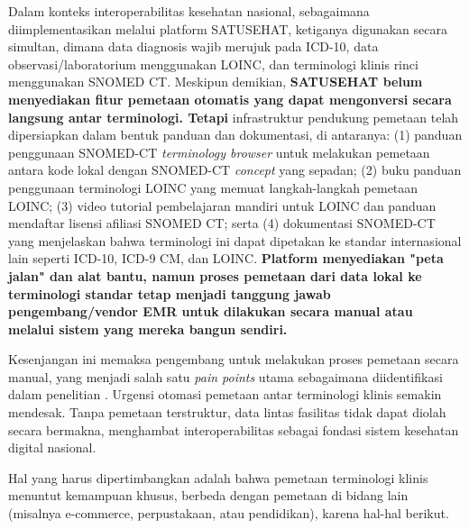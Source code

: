 Dalam konteks interoperabilitas kesehatan nasional, sebagaimana diimplementasikan melalui platform SATUSEHAT, ketiganya digunakan secara simultan, dimana data diagnosis wajib merujuk pada ICD-10, data observasi/laboratorium menggunakan LOINC, dan terminologi klinis rinci menggunakan SNOMED CT. Meskipun demikian, \textbf{SATUSEHAT belum menyediakan fitur pemetaan otomatis yang dapat mengonversi secara langsung antar terminologi. Tetapi} infrastruktur pendukung pemetaan telah dipersiapkan dalam bentuk panduan dan dokumentasi, di antaranya: (1) panduan penggunaan SNOMED-CT \textit{terminology browser} untuk melakukan pemetaan antara kode lokal dengan SNOMED-CT \textit{concept} yang sepadan; (2) buku panduan penggunaan terminologi LOINC yang memuat langkah-langkah pemetaan LOINC; (3) video tutorial pembelajaran mandiri untuk LOINC dan panduan mendaftar lisensi afiliasi SNOMED CT; serta (4) dokumentasi SNOMED-CT yang menjelaskan bahwa terminologi ini dapat dipetakan ke standar internasional lain seperti ICD-10, ICD-9 CM, dan LOINC. \textbf{Platform menyediakan "peta jalan" dan alat bantu, namun proses pemetaan dari data lokal ke terminologi standar tetap menjadi tanggung jawab pengembang/vendor EMR untuk dilakukan secara manual atau melalui sistem yang mereka bangun sendiri.}

Kesenjangan ini memaksa pengembang untuk melakukan proses pemetaan secara manual, yang menjadi salah satu \textit{pain points} utama sebagaimana diidentifikasi dalam penelitian \citet{heryawan_fast_2025}. Urgensi otomasi pemetaan antar terminologi klinis semakin mendesak. Tanpa pemetaan terstruktur, data lintas fasilitas tidak dapat diolah secara bermakna, menghambat interoperabilitas sebagai fondasi sistem kesehatan digital nasional.

Hal yang harus dipertimbangkan adalah bahwa pemetaan terminologi klinis menuntut kemampuan khusus, berbeda dengan pemetaan di bidang lain (misalnya e-commerce, perpustakaan, atau pendidikan), karena hal-hal berikut.

